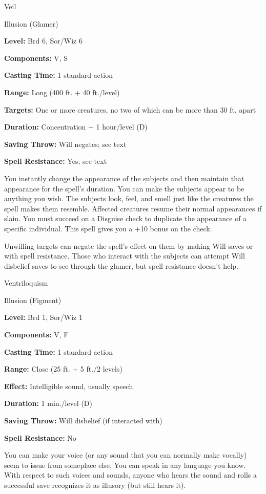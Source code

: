\documentclass{article}
\begin{document}
\vspace{12pt}
Veil

Illusion (Glamer)

\textbf{Level:} Brd 6, Sor/Wiz 6

\textbf{Components:} V, S

\textbf{Casting Time:} 1 standard action

\textbf{Range:} Long (400 ft. + 40 ft./level)

\textbf{Targets:} One or more creatures, no two of which can be more than 30 ft. 
apart

\textbf{Duration:} Concentration + 1 hour/level (D)

\textbf{Saving Throw: }Will negates; see text

\textbf{Spell Resistance:} Yes; see text

You instantly change the appearance of the subjects and then maintain that appearance 
for the spell's duration. You can make the subjects appear to be anything you wish. 
The subjects look, feel, and smell just like the creatures the spell makes them 
resemble. Affected creatures resume their normal appearances if slain. You must 
succeed on a Disguise check to duplicate the appearance of a specific individual. 
This spell gives you a +10 bonus on the check.

Unwilling targets can negate the spell's effect on them by making Will saves or 
with spell resistance. Those who interact with the subjects can attempt Will disbelief 
saves to see through the glamer, but spell resistance doesn't help.

\vspace{12pt}
Ventriloquism

Illusion (Figment)

\textbf{Level:} Brd 1, Sor/Wiz 1

\textbf{Components:} V, F

\textbf{Casting Time:} 1 standard action

\textbf{Range:} Close (25 ft. + 5 ft./2 levels)

\textbf{Effect:} Intelligible sound, usually speech

\textbf{Duration:} 1 min./level (D)

\textbf{Saving Throw: }Will disbelief (if interacted with)

\textbf{Spell Resistance:} No

You can make your voice (or any sound that you can normally make vocally) seem 
to issue from someplace else. You can speak in any language you know. With respect 
to such voices and sounds, anyone who hears the sound and rolls a successful save 
recognizes it as illusory (but still hears it).
\end{document}
